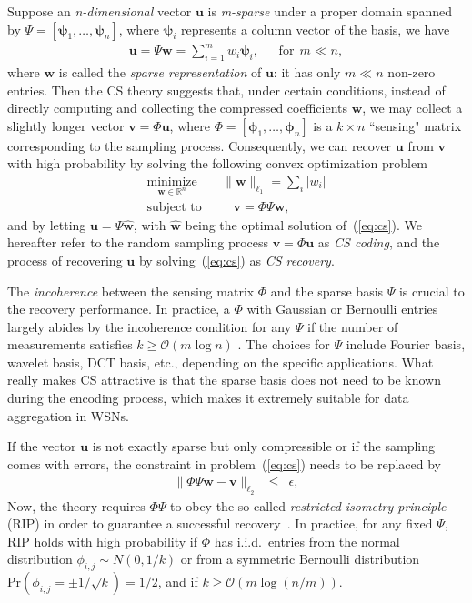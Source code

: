 \documentclass[conference]{IEEEtran}
\begin{document}
    Suppose an \textit{n-dimensional} vector $\mathbf{u}$ is \textit{m-sparse} under a proper domain spanned by $\Psi=[\boldsymbol{\psi}_1,\dots,\boldsymbol{\psi}_n]$, where $\boldsymbol{\psi}_i$ represents a column vector of the basis, we have
    \begin{eqnarray}
\mathbf{u} = \Psi \mathbf{w} = \sum_{i=1}^m w_i \boldsymbol{\psi}_i,~~~~~~~\mbox{for}~~m \ll n,
\end{eqnarray}
where $\mathbf{w}$ is called the \textit{sparse representation} of $\mathbf{u}$: it has only $m \ll n$ non-zero entries. Then the CS theory suggests that, under certain conditions, instead of directly computing and collecting the compressed coefficients $\mathbf{w}$, we may collect a slightly longer vector $\mathbf{v} = \Phi\mathbf{u}$, where $\Phi=[\boldsymbol{\phi}_1,\dots,\boldsymbol{\phi}_n]$ is a $k \times n$ ``sensing" matrix corresponding to the sampling process. Consequently, we can recover $\mathbf{u}$ from $\mathbf{v}$ with high probability by solving the following convex optimization problem
    \begin{eqnarray}
\underset{\mathbf{w} \in \mathbb{R}^n}{\mathrm{minimize}} && \|\mathbf{w}\|_{\ell_1} = \sum_i |w_i| \label{eq:cs} \\
\mbox{subject to} && ~~~~\mathbf{v} = \Phi \Psi \mathbf{w}, \nonumber
\end{eqnarray}
and by letting $\mathbf{u} = \Psi \mathbf{\hat{w}}$, with $\mathbf{\hat{w}}$ being the optimal solution of~(\ref{eq:cs}). We hereafter refer to the random sampling process $\mathbf{v} = \Phi\mathbf{u}$ as \textit{CS coding}, and the process of recovering $\mathbf{u}$ by solving~(\ref{eq:cs}) as \textit{CS recovery}.

    The \textit{incoherence} \cite{CandesRT-TIT06} between the sensing matrix $\Phi$ and the sparse basis $\Psi$ is crucial to the recovery performance. In practice, a $\Phi$ with Gaussian or Bernoulli entries largely abides by the incoherence condition for any $\Psi$ if the number of measurements satisfies $k \ge \mathcal{O}(m\log n)$ \cite{CandesRT-TIT06}. The choices for $\Psi$ include Fourier basis, wavelet basis, DCT basis, etc., depending on the specific applications. What really makes CS attractive is that the sparse basis does not need to be known during the encoding process, which makes it extremely suitable for data aggregation in WSNs.

    If the vector $\mathbf{u}$ is not exactly sparse but only compressible or if the sampling comes with errors, the constraint in problem~(\ref{eq:cs}) needs to be replaced by
    \begin{eqnarray}
\|\Phi \Psi \mathbf{w} - \mathbf{v} \|_{\ell_2} &\le& \epsilon,
\end{eqnarray}
    Now, the theory requires $\Phi\Psi$ to obey the so-called \textit{restricted isometry principle} (RIP) in order to guarantee a successful recovery~\cite{Candes-SPMag08}. In practice, for any fixed $\Psi$, RIP holds with high probability if $\Phi$ has i.i.d.\ entries from the normal distribution $\phi_{i,j}\sim N(0,1/k)$ or from a symmetric Bernoulli distribution $\mathrm{Pr}(\phi_{i,j}=\pm 1/\sqrt{k})=1/2$, and if $k \ge \mathcal{O}\left(m\log(n/m)\right)$.
\end{document}
